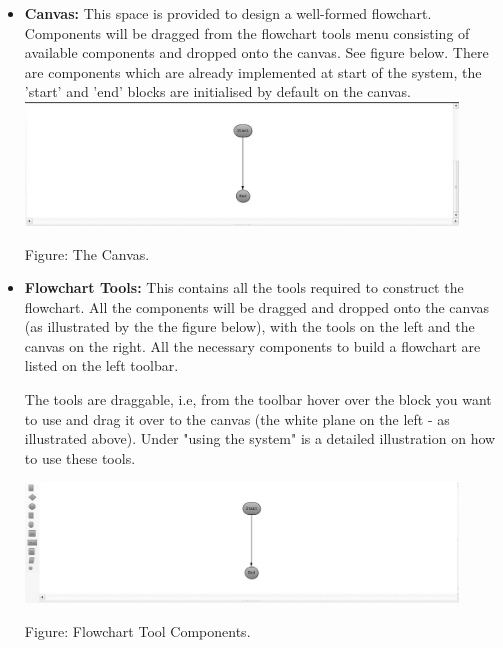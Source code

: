 \documentclass[11pt,a4paper,titlepage]{article}
\begin{document}
		
		\begin{itemize}
			\item \textbf{Canvas:} This space is provided to design a 			well-formed flowchart. Components will be dragged from the flowchart 				tools menu consisting of available components and dropped onto the 				canvas. See figure below.\newline
			There are components which are already implemented at start of the system, the 'start' and 'end' blocks are initialised by default on the canvas.\newline \newline
			\includegraphics[width=11.5cm]{Canvas.jpg}
			\begin{center}
		Figure: The Canvas.\newline
		\end{center}
			
			\item \textbf{Flowchart Tools:} This contains all the tools required to construct the flowchart. All the components will be dragged and dropped onto the canvas (as illustrated by the the figure below), with the tools on the left and the canvas on the right. All the necessary components to build a flowchart are listed on the left toolbar.\newline
			
		The tools are draggable, i.e, from the toolbar hover over the block you want to use and drag it over to the canvas (the white plane on the left - as illustrated above). Under "using the system" is a detailed illustration on how to use these tools. \newline \newline			
			
			\includegraphics[width=11.5cm]{Tools.jpg}
			\begin{center}
		Figure: Flowchart Tool Components.\newline
		\end{center} 
			

\end{itemize}
\end{document}

